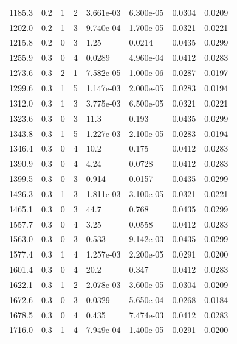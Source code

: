 \documentclass[preview]{standalone}
\begin{document}
{{{\begin{tabular}{L{1.2cm}C{1.2cm} C{0.3cm}C{0.5cm} C{1.4cm}C{1.4cm} C{1.4cm}C{1.4cm}}
  1185.3  &   0.2  & 1     &  2 &  3.661e-03  & 6.300e-05  & 0.0304 &  0.0209   \\ 
  1202.0  &   0.2  & 1     &  3 &  9.740e-04  & 1.700e-05  & 0.0321 &  0.0221   \\ 
  1215.8  &   0.2  & 0     &  3 &  1.25  & 0.0214  & 0.0435 &  0.0299   \\ 
  1255.9  &   0.3  & 0     &  4 &  0.0289  & 4.960e-04  & 0.0412 &  0.0283   \\ 
  1273.6  &   0.3  & 2     &  1 &  7.582e-05  & 1.000e-06  & 0.0287 &  0.0197   \\ 
  1299.6  &   0.3  & 1     &  5 &  1.147e-03  & 2.000e-05  & 0.0283 &  0.0194   \\ 
  1312.0  &   0.3  & 1     &  3 &  3.775e-03  & 6.500e-05  & 0.0321 &  0.0221   \\ 
  1323.6  &   0.3  & 0     &  3 &  11.3  & 0.193  & 0.0435 &  0.0299   \\ 
  1343.8  &   0.3  & 1     &  5 &  1.227e-03  & 2.100e-05  & 0.0283 &  0.0194   \\ 
  1346.4  &   0.3  & 0     &  4 &  10.2  & 0.175  & 0.0412 &  0.0283   \\ 
  1390.9  &   0.3  & 0     &  4 &  4.24  & 0.0728  & 0.0412 &  0.0283   \\ 
  1399.5  &   0.3  & 0     &  3 &  0.914  & 0.0157  & 0.0435 &  0.0299   \\ 
  1426.3  &   0.3  & 1     &  3 &  1.811e-03  & 3.100e-05  & 0.0321 &  0.0221   \\ 
  1465.1  &   0.3  & 0     &  3 &  44.7  & 0.768  & 0.0435 &  0.0299   \\ 
  1557.7  &   0.3  & 0     &  4 &  3.25  & 0.0558  & 0.0412 &  0.0283   \\ 
  1563.0  &   0.3  & 0     &  3 &  0.533  & 9.142e-03  & 0.0435 &  0.0299   \\ 
  1577.4  &   0.3  & 1     &  4 &  1.257e-03  & 2.200e-05  & 0.0291 &  0.0200   \\ 
  1601.4  &   0.3  & 0     &  4 &  20.2  & 0.347  & 0.0412 &  0.0283   \\ 
  1622.1  &   0.3  & 1     &  2 &  2.078e-03  & 3.600e-05  & 0.0304 &  0.0209   \\ 
  1672.6  &   0.3  & 0     &  3 &  0.0329  & 5.650e-04  & 0.0268 &  0.0184   \\ 
  1678.5  &   0.3  & 0     &  4 &  0.435  & 7.474e-03  & 0.0412 &  0.0283   \\ 
  1716.0  &   0.3  & 1     &  4 &  7.949e-04  & 1.400e-05  & 0.0291 &  0.0200   \\ 

\end{tabular}}}}
\end{document}
